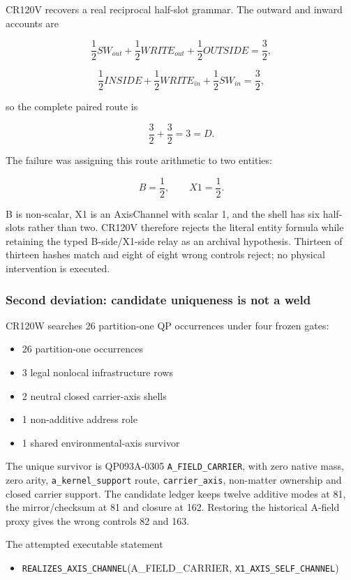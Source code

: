 CR120V recovers a real reciprocal half-slot grammar. The outward and
inward accounts are

\[
\frac12 SW_{out}+\frac12 WRITE_{out}+\frac12 OUTSIDE=\frac32,
\]

\[
\frac12 INSIDE+\frac12 WRITE_{in}+\frac12 SW_{in}=\frac32,
\]

so the complete paired route is

\[
\frac32+\frac32=3=D.
\]

The failure was assigning this route arithmetic to two entities:

\[
B=\frac12,\qquad X1=\frac12.
\]

B is non-scalar, X1 is an AxisChannel with scalar 1, and the shell has
six half-slots rather than two. CR120V therefore rejects the literal
entity formula while retaining the typed B-side/X1-side relay as an
archival hypothesis. Thirteen of thirteen hashes match and eight of
eight wrong controls reject; no physical intervention is executed.

\subsubsection{Second deviation: candidate uniqueness is not a
weld}\label{viii-ch05-second-deviation-candidate-uniqueness-is-not-a-weld}

CR120W searches 26 partition-one QP occurrences under four frozen gates:

\begin{itemize}
\tightlist
\item
  26 partition-one occurrences
\item
  3 legal nonlocal infrastructure rows
\item
  2 neutral closed carrier-axis shells
\item
  1 non-additive address role
\item
  1 shared environmental-axis survivor
\end{itemize}

The unique survivor is QP093A-0305 \texttt{A\_FIELD\_CARRIER}, with zero
native mass, zero arity, \texttt{a\_kernel\_support} route,
\texttt{carrier\_axis}, non-matter ownership and closed carrier support.
The candidate ledger keeps twelve additive modes at 81, the
mirror/checksum at 81 and closure at 162. Restoring the historical
A-field proxy gives the wrong controls 82 and 163.

The attempted executable statement

\begin{itemize}
\tightlist
\item
  \nolinkurl{REALIZES_AXIS_CHANNEL}(A\_FIELD\_CARRIER, \nolinkurl{X1_AXIS_SELF_CHANNEL})
\end{itemize}


